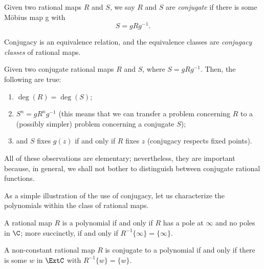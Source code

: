 \begin{definition}
    Given two rational maps $R$ and $S$, we say $R$ and $S$ are \emph{conjugate}
    if there is some Möbius map g with
    \[
        S = g R g^{-1}.
    \]
\end{definition}

\begin{remark}
    Conjugacy is an equivalence relation, and the equivalence classes are
    \emph{conjugacy classes} of rational maps.
\end{remark}

\begin{remark}
    Given two conjugate rational maps $R$ and $S$, where $S = g R g^{-1}$. Then,
    the following are true:
    \begin{enumerate}
        \item $\deg(R) = \deg(S)$;
        \item $S^n = g R^n g^{-1}$ (this means that we can transfer a problem
        concerning $R$ to a (possibly simpler) problem concerning a conjugate
        $S$);
        \item and $S$ fixes $g(z)$ if and only if $R$ fixes $z$ (conjugacy
        respects fixed points).
    \end{enumerate}
\end{remark}

All of these observations are elementary; nevertheless, they are important
because, in general, we shall not bother to distinguish between conjugate
rational functions.

As a simple illustration of the use of conjugacy, let us characterize the
polynomials within the class of rational maps.

\begin{remark}
    A rational map $R$ is a polynomial if and only if $R$ has a pole at $\infty$
    and no poles in $\C$; more succinctly, if and only if $R^{-1}\{\infty\} =
    \{\infty\}$.
\end{remark}

\begin{theorem}
    A non-constant rational map $R$ is conjugate to a polynomial if and only if
    there is some $w$ in $\ExtC$ with $R^{-1}\{w\} = \{w\}$.
\end{theorem}

